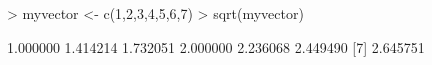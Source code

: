 \begin{Schunk}
\begin{Sinput}
> myvector <- c(1,2,3,4,5,6,7)
> sqrt(myvector)
\end{Sinput}
\begin{Soutput}
[1] 1.000000 1.414214 1.732051 2.000000 2.236068 2.449490
[7] 2.645751
\end{Soutput}
\end{Schunk}
